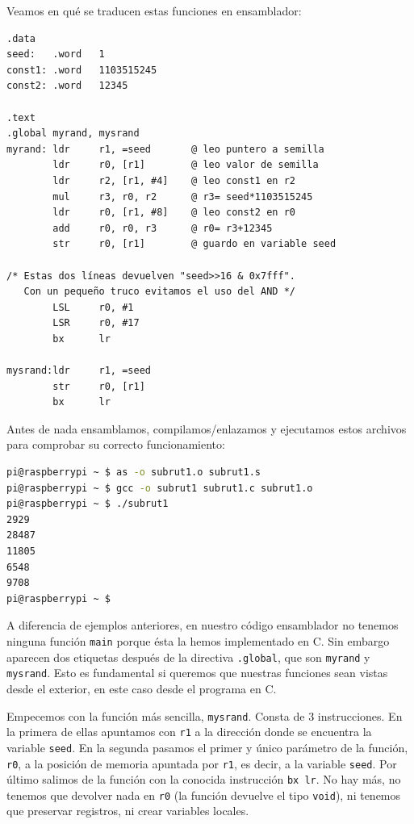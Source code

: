 \newpage
Veamos en qué se traducen estas funciones en ensamblador:

\begin{lstlisting}[caption={Código del programa subrut1.s},label={lst:codigoPract3_2}]
.data
seed:   .word   1
const1: .word   1103515245
const2: .word   12345

.text
.global myrand, mysrand
myrand: ldr     r1, =seed       @ leo puntero a semilla
        ldr     r0, [r1]        @ leo valor de semilla
        ldr     r2, [r1, #4]    @ leo const1 en r2
        mul     r3, r0, r2      @ r3= seed*1103515245
        ldr     r0, [r1, #8]    @ leo const2 en r0
        add     r0, r0, r3      @ r0= r3+12345
        str     r0, [r1]        @ guardo en variable seed

/* Estas dos líneas devuelven "seed>>16 & 0x7fff".
   Con un pequeño truco evitamos el uso del AND */
        LSL     r0, #1
        LSR     r0, #17
        bx      lr

mysrand:ldr     r1, =seed
        str     r0, [r1]
        bx      lr
\end{lstlisting}

Antes de nada ensamblamos, compilamos/enlazamos y ejecutamos estos archivos para
comprobar su correcto funcionamiento:

\begin{lstlisting}[language=bash]
pi@raspberrypi ~ $ as -o subrut1.o subrut1.s
pi@raspberrypi ~ $ gcc -o subrut1 subrut1.c subrut1.o
pi@raspberrypi ~ $ ./subrut1
2929
28487
11805
6548
9708
pi@raspberrypi ~ $
\end{lstlisting}

A diferencia de ejemplos anteriores, en nuestro código ensamblador no tenemos
ninguna función {\tt main} porque ésta la hemos implementado en C. Sin embargo
aparecen dos etiquetas después de la directiva {\tt .global}, que son
{\tt myrand} y {\tt mysrand}. Esto es fundamental si queremos que nuestras
funciones sean vistas desde el exterior, en este caso desde el programa en C.

Empecemos con la función más sencilla, {\tt mysrand}. Consta de 3 instrucciones.
En la primera de ellas apuntamos con {\tt r1} a la dirección donde se encuentra
la variable {\tt seed}. En la segunda pasamos el primer y único parámetro de la
función, {\tt r0}, a la posición de memoria apuntada por {\tt r1}, es decir, a
la variable {\tt seed}. Por último salimos de la función con la conocida
instrucción {\tt bx lr}. No hay más, no tenemos que devolver nada en {\tt r0}
(la función devuelve el tipo {\tt void}), ni tenemos que preservar registros,
ni crear variables locales.

